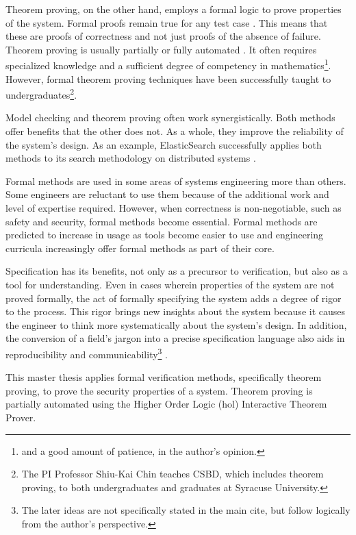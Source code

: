 \documentclass[../../main/main.tex]{subfiles}
\begin{document}
Theorem proving, on the other hand, employs a formal logic to prove properties of the system.  Formal proofs remain true for any test case \cite{formalCarnegie}.  This means that these are proofs of correctness and not just proofs of the absence of failure.  Theorem proving is usually partially or fully automated \cite{wikiformalmethods}.  It often requires specialized knowledge and a sufficient degree of competency in mathematics\footnote{and a good amount of patience, in the author's opinion.}. However, formal theorem proving techniques have been successfully taught to undergraduates\footnote{The PI Professor Shiu-Kai Chin teaches CSBD, which includes theorem proving, to both undergraduates and graduates at Syracuse University.}.  


Model checking and theorem proving often work synergistically.  Both methods offer benefits that the other does not.  As a whole, they improve the reliability of the system's design.   As an example, ElasticSearch successfully applies both methods to its search methodology on distributed systems \cite{elasticsearch}.  

Formal methods are used in some areas of systems engineering more than others.  Some engineers are reluctant to use them because of the additional work and level of expertise required.  However, when correctness is non-negotiable, such as safety and security, formal methods become essential.  Formal methods are predicted to increase in usage as tools become easier to use and engineering curricula increasingly offer formal methods as part of their core\cite{formalCarnegie}.

Specification has its benefits, not only as a precursor to verification, but also as a tool for understanding.  Even in cases wherein properties of the system are not proved formally, the act of formally specifying the system adds a degree of rigor to the process. This rigor brings new insights about the system because it causes the engineer to think more systematically about the system's design.  In addition, the conversion of a field's jargon into a precise specification language also aids in reproducibility and communicability\footnote{The later ideas are not specifically stated in the main cite, but follow logically from the author's perspective.} \cite{formalCarnegie}.  

This master thesis applies formal verification methods, specifically theorem proving, to prove the security properties of a system.  Theorem proving is partially automated using the Higher Order Logic (\gls{hol}) Interactive Theorem Prover. 
\end{document}
